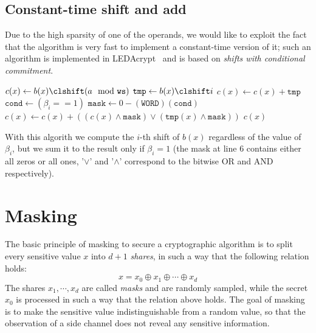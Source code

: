 	\subsection{Constant-time shift and add}\label{subsec:const_shift_add}
		Due to the high sparsity of one of the operands, we would like to exploit the fact that the algorithm is very fast to implement a constant-time version of it;
		such an algorithm is implemented in LEDAcrypt~\cite{baldi2020ledacrypt} and is based on \textit{shifts with conditional commitment}.\\

		\begin{algorithm2e}[H]
			\caption{Constant-time monomial multiplication}

			$c(x) \gets b(x) \clshift (a \mod \texttt{ws})$\;
			 {
				$\texttt{tmp} \gets b(x) \clshift i$\;
				$c(x) \gets c(x) + \texttt{tmp}$\;
				$\texttt{cond} \gets (\beta_{i} == 1)$\;
				$\texttt{mask} \gets 0 - (\texttt{WORD})(\texttt{cond})$\;
				$c(x) \gets c(x) + ((c(x) \wedge \texttt{mask}) \vee (\texttt{tmp}(x) \wedge \texttt{mask}))$\;
			}
			\KwRet $c(x)$\;
		\end{algorithm2e}
		With this algorith we compute the $i$-th shift of $b(x)$ regardless of the value of $\beta_i$, but we sum it to the result only if
		$\beta_i = 1$ (the mask at line 6 contains either all zeros or all ones, '$\vee$' and '$\wedge$' correspond to the bitwise OR and AND respectively).

\section{Masking}
    The basic principle of masking to secure a cryptographic algorithm is to split every sensitive value $x$ into $d+1$ \textit{shares},
    in such a way that the following relation holds:
    \begin{equation}
        x = x_0 \oplus x_1 \oplus \cdots \oplus x_d
    \end{equation}
    The shares $x_1, \cdots, x_d$ are called \textit{masks} and are randomly sampled, while the secret $x_0$ is processed in 
    such a way that the relation above holds. The goal of masking is to make the sensitive value indistinguishable from
    a random value, so that the observation of a side channel does not reveal any sensitive information.

